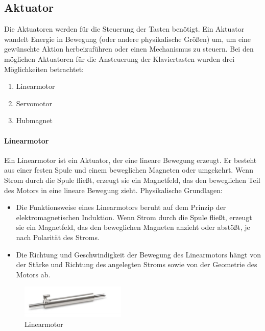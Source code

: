 \subsection{Aktuator}\label{subsec:aktuator}
Die Aktuatoren werden für die Steuerung der Tasten benötigt.
Ein Aktuator wandelt Energie in Bewegung (oder andere physikalische Größen) um, um eine gewünschte Aktion herbeizuführen
oder einen Mechanismus zu steuern. \newline %
Bei den möglichen Aktuatoren für die Ansteuerung der Klaviertasten wurden drei Möglichkeiten betrachtet: %
\begin{enumerate}
	\item Linearmotor %
	\item Servomotor
	\item Hubmagnet
\end{enumerate}

\paragraph{Linearmotor}
Ein Linearmotor ist ein Aktuator, der eine lineare Bewegung erzeugt. Er besteht aus einer festen Spule und einem
beweglichen Magneten oder umgekehrt. Wenn Strom durch
die Spule fließt, erzeugt sie %
ein Magnetfeld, das den beweglichen Teil des Motors in eine lineare Bewegung zieht. \newline
Physikalische Grundlagen:
\begin{itemize}
	\item Die Funktionsweise eines Linearmotors beruht auf dem Prinzip der elektromagnetischen Induktion. Wenn Strom durch die
	Spule fließt, erzeugt sie ein Magnetfeld, das den beweglichen Magneten anzieht oder abstößt, je nach Polarität des Stroms.
	\item Die Richtung und Geschwindigkeit der Bewegung des Linearmotors hängt von der Stärke und Richtung des angelegten Stroms
	sowie von der Geometrie des Motors ab.
\end{itemize}
\begin{figure}[htbp]
	\centering
	\includegraphics[width=5cm]{img/Linearmotor}
	\caption{Linearmotor}
	\label{fig:Linearmotor}
\end{figure}

